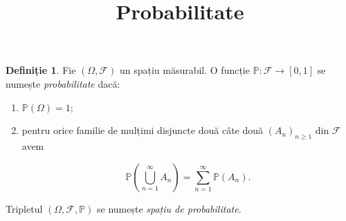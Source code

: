 \documentclass[12pt]{article}
\title{Probabilitate}
\author{}
\date{}
\theoremstyle{definition}
\newtheorem{definition}{Definiție}
\begin{document}
\maketitle

\begin{definition}
Fie $(\Omega, \mathcal{F})$ un spațiu măsurabil. 
O funcție $\mathbb{P} : \mathcal{F} \to [0,1]$ se numește \emph{probabilitate} dacă:
\begin{enumerate}
    \item $\mathbb{P}(\Omega) = 1$;
    \item pentru orice familie de mulțimi disjuncte două câte două $(A_n)_{n \ge 1}$ din $\mathcal{F}$ avem
    

\[
        \mathbb{P}\!\left( \bigcup_{n=1}^{\infty} A_n \right)
        = \sum_{n=1}^{\infty} \mathbb{P}(A_n).
    \]


\end{enumerate}
\end{definition}

\noindent
Tripletul $(\Omega, \mathcal{F}, \mathbb{P})$ se numește \emph{spațiu de probabilitate}.
\end{document}
